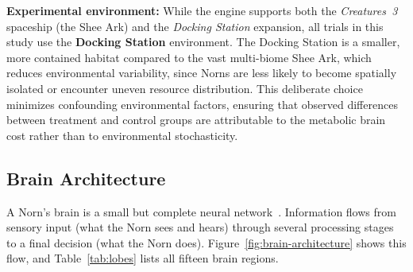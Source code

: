 \documentclass[12pt, a4paper]{article}
\begin{document}
\noindent\textbf{Experimental environment:} While the engine supports both the \textit{Creatures~3} spaceship (the Shee Ark) and the \textit{Docking Station} expansion, all trials in this study use the \textbf{Docking Station} environment. The Docking Station is a smaller, more contained habitat compared to the vast multi-biome Shee Ark, which reduces environmental variability, since Norns are less likely to become spatially isolated or encounter uneven resource distribution. This deliberate choice minimizes confounding environmental factors, ensuring that observed differences between treatment and control groups are attributable to the metabolic brain cost rather than to environmental stochasticity.

\subsection{Brain Architecture}
\label{sec:brain-arch}

A Norn's brain is a small but complete neural network~\cite{grand1998creatures}. Information flows from sensory input (what the Norn sees and hears) through several processing stages to a final decision (what the Norn does). Figure~\ref{fig:brain-architecture} shows this flow, and Table~\ref{tab:lobes} lists all fifteen brain regions.
\end{document}
